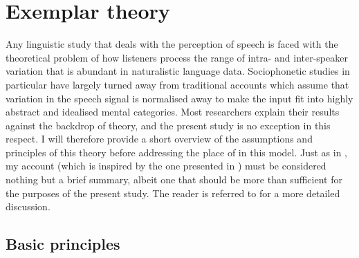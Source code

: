 	\section{Exemplar theory}
	\label{sec.sal.exemplar}

Any linguistic study that deals with the perception of speech is faced with the theoretical problem of how listeners process the range of intra- and inter-speaker variation that is abundant in naturalistic language data.
Sociophonetic studies in particular have largely turned away from traditional accounts which assume that variation in the speech signal is normalised away to make the input fit into highly abstract and idealised mental categories.
Most researchers explain their results against the backdrop of  theory, and the present study is no exception in this respect.
I will therefore provide a short overview of the assumptions and principles of this theory before addressing the place of  in this model.
Just as in , my account (which is inspired by the one presented in \citealt{juskanma}) must be considered nothing but a brief summary, albeit one that should be more than sufficient for the purposes of the present study.
The reader is referred to \citealt{pierrehumbert2006} for a more detailed discussion.

		\subsection{Basic principles}
		\label{sec.sal.exemplar.basic}
		
